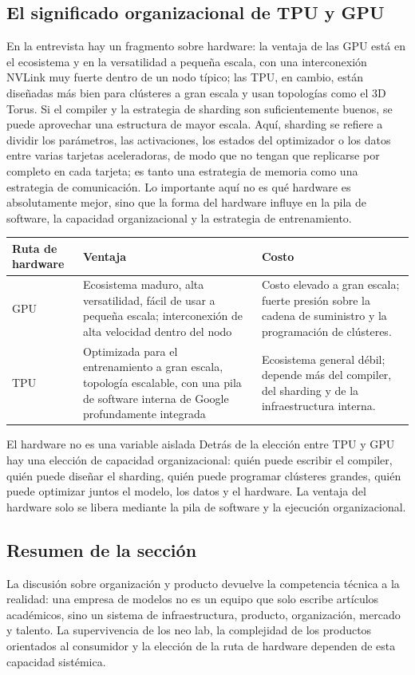 \subsection{El significado organizacional de TPU y GPU}

En la entrevista hay un fragmento sobre hardware: la ventaja de las GPU está en el ecosistema y en la versatilidad a pequeña escala, con una interconexión NVLink muy fuerte dentro de un nodo típico; las TPU, en cambio, están diseñadas más bien para clústeres a gran escala y usan topologías como el 3D Torus. Si el compiler y la estrategia de sharding son suficientemente buenos, se puede aprovechar una estructura de mayor escala. Aquí, sharding se refiere a dividir los parámetros, las activaciones, los estados del optimizador o los datos entre varias tarjetas aceleradoras, de modo que no tengan que replicarse por completo en cada tarjeta; es tanto una estrategia de memoria como una estrategia de comunicación. Lo importante aquí no es qué hardware es absolutamente mejor, sino que la forma del hardware influye en la pila de software, la capacidad organizacional y la estrategia de entrenamiento.

\noindent\begin{tabularx}{\textwidth}{p{}p{}X}
\toprule
Ruta de hardware & Ventaja & Costo \\
\midrule
GPU & Ecosistema maduro, alta versatilidad, fácil de usar a pequeña escala; interconexión de alta velocidad dentro del nodo & Costo elevado a gran escala; fuerte presión sobre la cadena de suministro y la programación de clústeres. \\
TPU & Optimizada para el entrenamiento a gran escala, topología escalable, con una pila de software interna de Google profundamente integrada & Ecosistema general débil; depende más del compiler, del sharding y de la infraestructura interna. \\
\bottomrule
\end{tabularx}

\begin{importantbox}{El hardware no es una variable aislada}
Detrás de la elección entre TPU y GPU hay una elección de capacidad organizacional: quién puede escribir el compiler, quién puede diseñar el sharding, quién puede programar clústeres grandes, quién puede optimizar juntos el modelo, los datos y el hardware. La ventaja del hardware solo se libera mediante la pila de software y la ejecución organizacional.
\end{importantbox}

\subsection{Resumen de la sección}

La discusión sobre organización y producto devuelve la competencia técnica a la realidad: una empresa de modelos no es un equipo que solo escribe artículos académicos, sino un sistema de infraestructura, producto, organización, mercado y talento. La supervivencia de los neo lab, la complejidad de los productos orientados al consumidor y la elección de la ruta de hardware dependen de esta capacidad sistémica.
